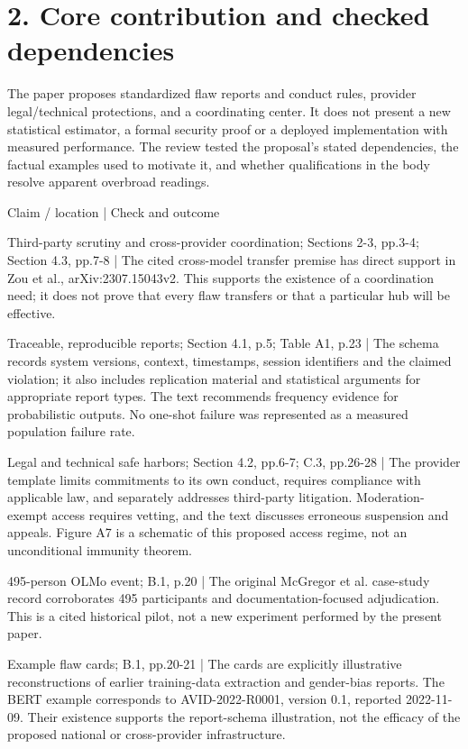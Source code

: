 \documentclass[10pt]{article}
\begin{document}
\section*{2. Core contribution and checked dependencies}
The paper proposes standardized flaw reports and conduct rules, provider legal/technical protections, and a coordinating center. It does not present a new statistical estimator, a formal security proof or a deployed implementation with measured performance. The review tested the proposal’s stated dependencies, the factual examples used to motivate it, and whether qualifications in the body resolve apparent overbroad readings.\par
Claim / location | Check and outcome\par
Third-party scrutiny and cross-provider coordination; Sections 2-3, pp.3-4; Section 4.3, pp.7-8 | The cited cross-model transfer premise has direct support in Zou et al., arXiv:2307.15043v2. This supports the existence of a coordination need; it does not prove that every flaw transfers or that a particular hub will be effective.\par
Traceable, reproducible reports; Section 4.1, p.5; Table A1, p.23 | The schema records system versions, context, timestamps, session identifiers and the claimed violation; it also includes replication material and statistical arguments for appropriate report types. The text recommends frequency evidence for probabilistic outputs. No one-shot failure was represented as a measured population failure rate.\par
Legal and technical safe harbors; Section 4.2, pp.6-7; C.3, pp.26-28 | The provider template limits commitments to its own conduct, requires compliance with applicable law, and separately addresses third-party litigation. Moderation-exempt access requires vetting, and the text discusses erroneous suspension and appeals. Figure A7 is a schematic of this proposed access regime, not an unconditional immunity theorem.\par
495-person OLMo event; B.1, p.20 | The original McGregor et al. case-study record corroborates 495 participants and documentation-focused adjudication. This is a cited historical pilot, not a new experiment performed by the present paper.\par
Example flaw cards; B.1, pp.20-21 | The cards are explicitly illustrative reconstructions of earlier training-data extraction and gender-bias reports. The BERT example corresponds to AVID-2022-R0001, version 0.1, reported 2022-11-09. Their existence supports the report-schema illustration, not the efficacy of the proposed national or cross-provider infrastructure.\par
\end{document}
